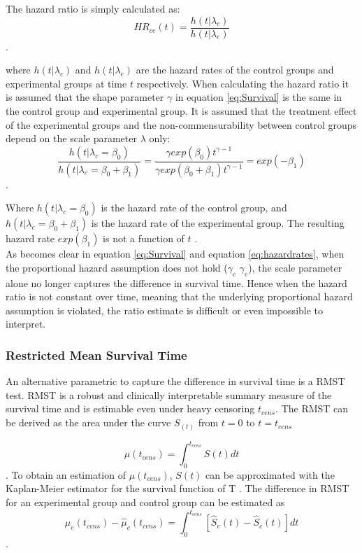 \documentclass[Royal,sagev,times]{sagej}
\begin{document}
The hazard ratio is simply calculated as:
\begin{equation}
    {HR_{ce}}(t) = \frac{h(t|\lambda_c)}{h(t|\lambda_e)}
\end{equation}.\cite{spruance2004} 

where $h(t|\lambda_c)$ and $h(t|\lambda_e)$ are the hazard rates of the control groups and experimental groups at time $t$ respectively. When calculating the hazard ratio it is assumed that the shape parameter $\gamma$ in equation \ref{eq:Survival} is the same in the control group and experimental group. It is assumed that the treatment effect of the experimental groups and the non-commensurability between control groups depend on the scale parameter $\lambda$ only:
\begin{equation}\label{eq:hazardrates}
\frac{h(t|\lambda_c = \beta_0)}{h(t|\lambda_e = \beta_0 + \beta_1)}= \frac{\gamma exp{(\beta_0)}t^{\gamma-1}}
{\gamma exp{(\beta_0+\beta_1)}t^{\gamma-1}} = exp{(-\beta_1)}
\end{equation} .\cite{crumer2011}

Where $h(t|\lambda_c = \beta_0)$ is the hazard rate of the control group, and $h(t|\lambda_e = \beta_0 + \beta_1)$ is the hazard rate of the experimental group. The resulting hazard rate $exp{(\beta_1)}$ is not a function of $t$ .\cite{crumer2011} 
\\

As becomes clear in equation \ref{eq:Survival} and equation \ref{eq:hazardrates}, when the proportional hazard assumption does not hold ($\gamma_c$ \neq $\gamma_e$), the scale parameter alone no longer captures the difference in survival time. Hence when the hazard ratio is not constant over time, meaning that the underlying proportional hazard assumption is violated, the ratio estimate is difficult or even impossible to interpret. \cite{huang2018RMST}

\subsubsection{Restricted Mean Survival Time}
An alternative parametric to capture the difference in survival time is a RMST test.\cite{huang2018RMST}
RMST is a robust and clinically interpretable summary measure of the survival time and is estimable even under heavy censoring $t_{cens}$.\cite{huang2018RMST} The RMST can be derived as the area under the curve $S_{(t)}$ from $t=0$ to $t=t_{cens}$

\begin{equation}
{\mu(t_{cens}) = \int_0^{t_{cens}} \! S(t) dt
}
\end{equation}.\cite{huang2018RMST}
To obtain an estimation of $\mu(t_{cens})$, $S(t)$ can be approximated with the Kaplan-Meier estimator for the survival function of T .\cite{huang2018RMST} The difference in RMST for an experimental group and control group can be estimated as
\begin{equation}
{ \hat{\mu}_e(t_{cens}) - \hat{\mu}_c(t_{cens})= \int_0^{t_{cens}} \! [\hat{S}_e(t)-\hat{S}_c(t)] dt
}
\end{equation}.\cite{huang2018RMST}
\end{document}
